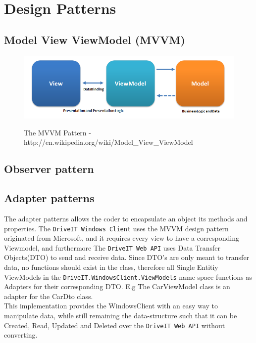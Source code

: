\section{Design Patterns}
\subsection{Model View ViewModel (MVVM)}
\begin{figure}[H]
	\centering
	\includegraphics[scale=0.6]{Figures/WebImages/MVVMPattern}\\
	\caption{The MVVM Pattern - http://en.wikipedia.org/wiki/Model\_View\_ViewModel}
	\label{fig:MVVMPattern}
\end{figure}

\subsection{Observer pattern}

\subsection{Adapter patterns}
The adapter patterns allows the coder to encapsulate an object its methods and properties. The \texttt{DriveIT Windows Client} uses the MVVM design pattern originated from Microsoft, and it requires every view to have a corresponding Viewmodel, and furthermore The \texttt{DriveIT Web API} uses Data Transfer Objects(DTO) to send and receive data. Since DTO's are only meant to transfer data, no functions should exist in the class, therefore all Single Entitiy ViewModels in the \texttt{DriveIT.WindowsClient.ViewModels} name-space functions as Adapters for their corresponding DTO. E.g The CarViewModel class is an adapter for the CarDto class.\\ 

This implementation provides the WindowsClient with an easy way to manipulate data, while still remaining the data-structure such that it can be Created, Read, Updated and Deleted over the \texttt{DriveIT Web API} without converting.